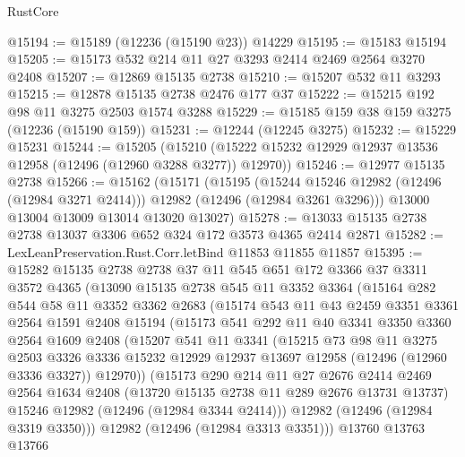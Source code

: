\begin{lexlean}{RustCore}
\begin{coremodule}
@15194 := @15189 (@12236 (@15190 @23)) @14229
@15195 := @15183 @15194
@15205 := @15173 @532 @214 @11 @27 @3293 @2414 @2469 @2564 @3270 @2408
@15207 := @12869 @15135 @2738
@15210 := @15207 @532 @11 @3293
@15215 := @12878 @15135 @2738 @2476 @177 @37
@15222 := @15215 @192 @98 @11 @3275 @2503 @1574 @3288
@15229 := @15185 @159 @38 @159 @3275 (@12236 (@15190 @159))
@15231 := @12244 (@12245 @3275)
@15232 := @15229 @15231
@15244 := @15205
    (@15210 (@15222 @15232 @12929 @12937 @13536 @12958 (@12496 (@12960 @3288 @3277)) @12970))
@15246 := @12977 @15135 @2738
@15266 := @15162
    (@15171
      (@15195
        (@15244 @15246 @12982 (@12496 (@12984 @3271 @2414)))
        @12982
        (@12496 (@12984 @3261 @3296)))
      @13000
      @13004
      @13009
      @13014
      @13020
      @13027)
@15278 := @13033 @15135 @2738 @2738 @13037 @3306 @652 @324 @172 @3573 @4365 @2414 @2871
@15282 := LexLeanPreservation.Rust.Corr.letBind @11853 @11855 @11857
@15395 := @15282
    @15135
    @2738
    @2738
    @37
    @11
    @545
    @651
    @172
    @3366
    @37
    @3311
    @3572
    @4365
    (@13090
      @15135
      @2738
      @545
      @11
      @3352
      @3364
      (@15164
        @282
        @544
        @58
        @11
        @3352
        @3362
        @2683
        (@15174
          @543
          @11
          @43
          @2459
          @3351
          @3361
          @2564
          @1591
          @2408
          @15194
          (@15173
            @541
            @292
            @11
            @40
            @3341
            @3350
            @3360
            @2564
            @1609
            @2408
            (@15207
              @541
              @11
              @3341
              (@15215
                @73
                @98
                @11
                @3275
                @2503
                @3326
                @3336
                @15232
                @12929
                @12937
                @13697
                @12958
                (@12496 (@12960 @3336 @3327))
                @12970))
            (@15173
              @290
              @214
              @11
              @27
              @2676
              @2414
              @2469
              @2564
              @1634
              @2408
              (@13720 @15135 @2738 @11 @289 @2676 @13731 @13737)
              @15246
              @12982
              (@12496 (@12984 @3344 @2414)))
            @12982
            (@12496 (@12984 @3319 @3350)))
          @12982
          (@12496 (@12984 @3313 @3351)))
        @13760
        @13763
        @13766

\end{coremodule}
\end{lexlean}
